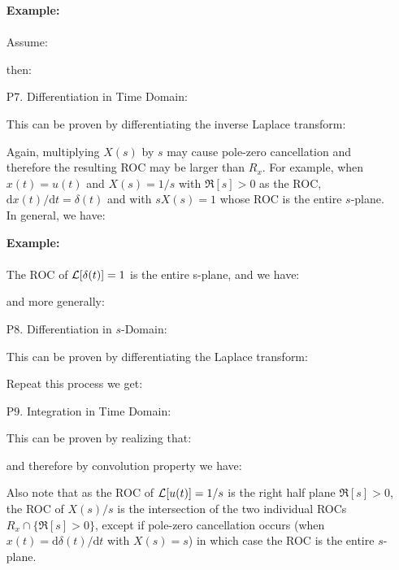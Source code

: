 \begin{enumerate}
		\begin{tcolorbox}[colframe=black,colback=white,sharp corners]
		\textbf{{\Large {}}Example:}\\\\
		Assume:
		
		then:
		
		\end{tcolorbox}
		
		\item[P7.] Differentiation in Time Domain:
		
		This can be proven by differentiating the inverse Laplace transform:
		
		Again, multiplying $X(s)$ by $s$ may cause pole-zero cancellation and therefore the resulting ROC may be larger than $R_x$. For example, when $x(t)=u(t)$ and $X(s)=1/s$ with $\Re[s]>0$ as the ROC, $\mathrm{d} x(t)/\mathrm{d}t=\delta(t)$ and with $sX(s)=1$ whose ROC is the entire $s$-plane. In general, we have:
		
		
		\begin{tcolorbox}[colframe=black,colback=white,sharp corners]
		\textbf{{\Large {}}Example:}\\\\
		The ROC of ${\cal L}[\delta(t)]=1$ is the entire s-plane, and we have:
		
		and more generally:
		
		\end{tcolorbox}
		
		\item[P8.] Differentiation in $s$-Domain:
		
		This can be proven by differentiating the Laplace transform:
		
		Repeat this process we get:
		
		
		\item[P9.] Integration in Time Domain:
		
		This can be proven by realizing that:
		
		and therefore by convolution property we have:
		
		Also note that as the ROC of ${\cal L}[u(t)]=1/s$ is the right half plane $\Re[s]>0$, the ROC of $X(s)/s$ is the intersection of the two individual ROCs $R_x \cap \{\Re[s]>0\}$, except if pole-zero cancellation occurs (when $x(t)=\mathrm{d}\delta(t)/\mathrm{d}t$ with $X(s)=s$) in which case the ROC is the entire $s$-plane.
	\end{enumerate}
	
